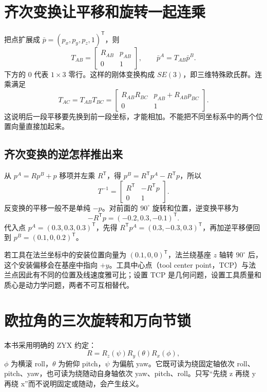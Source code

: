 \section{齐次变换让平移和旋转一起连乘}
把点扩展成 $\bar p=(p_x,p_y,p_z,1)^\mathsf T$，则
\begin{equation}
 T_{AB}=\begin{bmatrix}R_{AB}&p_{AB}\\0&1\end{bmatrix},
 \qquad\bar p^A=T_{AB}\bar p^B.
\end{equation}
下方的 0 代表 $1\times3$ 零行。这样的刚体变换构成 $SE(3)$，即三维特殊欧氏群。连乘满足
\begin{equation}
 T_{AC}=T_{AB}T_{BC}
 =\begin{bmatrix}R_{AB}R_{BC}&p_{AB}+R_{AB}p_{BC}\\0&1\end{bmatrix}.
\end{equation}
这说明后一段平移要先换到前一段坐标，才能相加。不能把不同坐标系中的两个位置向量直接加起来。

\subsection{齐次变换的逆怎样推出来}
从 $p^A=Rp^B+p$ 移项并左乘 $R^\mathsf T$，得 $p^B=R^\mathsf Tp^A-R^\mathsf Tp$，所以
\begin{equation}
 T^{-1}=\begin{bmatrix}R^\mathsf T&-R^\mathsf Tp\\0&1\end{bmatrix}.
\end{equation}
反变换的平移一般不是单纯 $-p$。对前面的 $90^\circ$ 旋转和位置，逆变换平移为
\[
 -R^\mathsf Tp=(-0.2,0.3,-0.1)^\mathsf T.
\]
代入点 $p^A=(0.3,0.3,0.3)^\mathsf T$，先得 $R^\mathsf Tp^A=(0.3,-0.3,0.3)^\mathsf T$，再加逆平移便回到 $p^B=(0.1,0,0.2)^\mathsf T$。

若工具在法兰坐标中的安装位置向量为 $(0.1,0,0)^\mathsf T$，法兰绕基座 $z$ 轴转 $90^\circ$ 后，这个安装偏移会在基座中指向 $+y$。工具中心点（tool center point，TCP）与法兰点因此有不同的位置及线速度雅可比；设置 TCP 是几何问题，设置工具质量和质心是动力学问题，两者不可互相替代。

\section{欧拉角的三次旋转和万向节锁}
本书采用明确的 ZYX 约定：
\begin{equation}
 R=R_z(\psi)R_y(\theta)R_x(\phi),
\end{equation}
$\phi$ 为横滚 roll，$\theta$ 为俯仰 pitch，$\psi$ 为偏航 yaw。它既可读为绕固定轴依次 roll、pitch、yaw，也可读为绕随动自身轴依次 yaw、pitch、roll。只写“先绕 z 再绕 y 再绕 x”而不说明固定或随动，会产生歧义。

